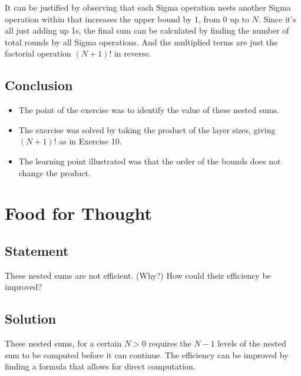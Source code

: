 \documentclass[12pt]{article}
\begin{document}
It can be justified by observing that each Sigma operation nests another Sigma
operation within that increases the upper bound by 1, from 0 up to $N$. Since
it's all just adding up 1s, the final sum can be calculated by finding the
number of total rounds by all Sigma operations. And the multiplied terms are
just the factorial operation $(N + 1)!$ in reverse.


\subsection{Conclusion}

\begin{itemize}

\item
  The point of the exercise was to identify the value of these nested sums.

\item
  The exercise was solved by taking the product of the layer sizes, giving $(N + 1)!$ as in Exercise 10.

\item
  The learning point illustrated was that the order of the bounds does not change the product.

\end{itemize}


\newpage

\section{Food for Thought}


\subsection{Statement}

These nested sums are not efficient. (Why?) How could their efficiency be
improved?


\subsection{Solution}

These nested sums, for a certain $N > 0$ requires the $N - 1$ levels of the
nested sum to be computed before it can continue. The efficiency can be improved
by finding a formula that allows for direct computation.
\end{document}
